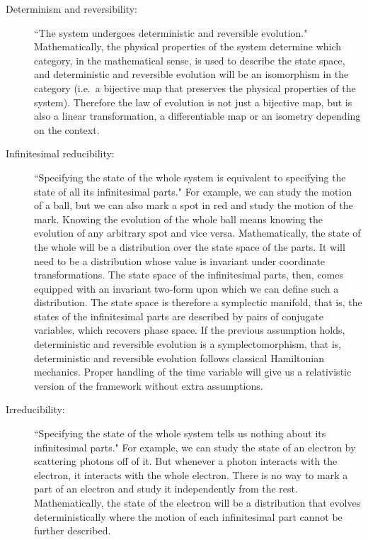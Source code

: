 \documentclass[11pt,letterpaper,fleqn]{memoir} %
\begin{document}
\begin{description}
	\item[Determinism and reversibility:] ``The system undergoes deterministic and reversible evolution." Mathematically, the physical properties of the system determine which category, in the mathematical sense, is used to describe the state space, and deterministic and reversible evolution will be an isomorphism in the category (i.e.~a bijective map that preserves the physical properties of the system). Therefore the law of evolution is not just a bijective map, but is also a linear transformation, a differentiable map or an isometry depending on the context.
	
	\item[Infinitesimal reducibility:] ``Specifying the state of the whole system is equivalent to specifying the state of all its infinitesimal parts." For example, we can study the motion of a ball, but we can also mark a spot in red and study the motion of the mark. Knowing the evolution of the whole ball means knowing the evolution of any arbitrary spot and vice versa. Mathematically, the state of the whole will be a distribution over the state space of the parts. It will need to be a distribution whose value is invariant under coordinate transformations. The state space of the infinitesimal parts, then, comes equipped with an invariant two-form upon which we can define such a distribution. The state space is therefore a symplectic manifold, that is,
	the states of the infinitesimal parts are described by pairs of conjugate variables, which recovers phase space. If the previous assumption holds, deterministic and reversible evolution is a symplectomorphism, that is,  deterministic and reversible evolution follows classical Hamiltonian mechanics. Proper handling of the time variable will give us a relativistic version of the framework without extra assumptions.
	
	\item[Irreducibility:] ``Specifying the state of the whole system tells us nothing about its infinitesimal parts." For example, we can study the state of an electron by scattering photons off of it. But whenever a photon interacts with the electron, it interacts with the whole electron. There is no way to mark a part of an electron and study it independently from the rest. Mathematically, the state of the electron will be a distribution that evolves deterministically where the motion of each infinitesimal part cannot be further described.
	

\end{description}
\end{document}
